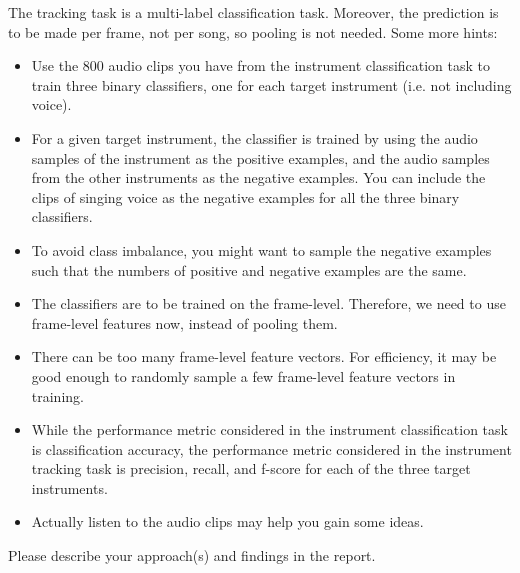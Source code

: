 \documentclass[twoside,a4paper]{refart}
\begin{document}
The tracking task is a multi-label classification task. Moreover, the prediction is to be made per frame, not per song, so pooling is not needed.
Some more hints:
\begin{itemize}
\item Use the 800 audio clips you have from the instrument classification task to train three binary classifiers, one for each target instrument (i.e. not including voice).
\item For a given target instrument, the classifier is trained by using the audio samples of the instrument as the positive examples, and the audio samples from the other instruments as the negative examples. You can include the clips of singing voice as the negative examples for all the three binary classifiers.
\item To avoid class imbalance, you might want to sample the negative examples such that the numbers of positive and negative examples are the same.
\item The classifiers are to be trained on the frame-level. Therefore, we need to use frame-level features now, instead of pooling them.
\item There can be too many frame-level feature vectors. For efficiency, it may be good enough to randomly sample a few frame-level feature vectors in training.
\item While the performance metric considered in the instrument classification task is classification accuracy, the performance metric considered in the instrument tracking task is precision, recall, and f-score for each of the three target instruments.
\item Actually listen to the audio clips may help you gain some ideas.
\end{itemize}

Please describe your approach(s) and findings in the report.
\end{document}
